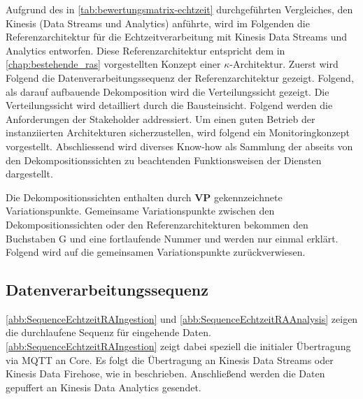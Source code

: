 Aufgrund des in \autoref{tab:bewertungsmatrix-echtzeit} durchgeführten Vergleiches, den Kinesis (Data Streams und Analytics) anführte, wird im Folgenden die Referenzarchitektur für die Echtzeitverarbeitung mit Kinesis Data Streams und Analytics entworfen. Diese Referenzarchitektur entspricht dem in \autoref{chap:bestehende_ras} vorgestellten Konzept einer $\kappa$-Architektur. Zuerst wird Folgend die Datenverarbeitungssequenz der Referenzarchitektur gezeigt. Folgend, als darauf aufbauende Dekomposition wird die Verteilungssicht gezeigt. Die Verteilungssicht wird detailliert durch die Bausteinsicht. Folgend werden die Anforderungen der Stakeholder addressiert. Um einen guten Betrieb der instanziierten Architekturen sicherzustellen, wird folgend ein Monitoringkonzept vorgestellt. Abschliessend wird diverses Know-how als Sammlung der abseits von den Dekompositionssichten zu beachtenden Funktionsweisen der Diensten dargestellt.

Die Dekompositionssichten enthalten durch \textbf{VP} gekennzeichnete Variationspunkte. Gemeinsame Variationspunkte zwischen den Dekompositionssichten oder den Referenzarchitekturen bekommen den Buchstaben G und eine fortlaufende Nummer und werden nur einmal erklärt. Folgend wird auf die gemeinsamen Variationspunkte zurückverwiesen.

\subsection{Datenverarbeitungssequenz}
\autoref{abb:SequenceEchtzeitRAIngestion} und \autoref{abb:SequenceEchtzeitRAAnalysis} zeigen die durchlaufene Sequenz für eingehende Daten. \autoref{abb:SequenceEchtzeitRAIngestion} zeigt dabei speziell die initialer Übertragung via \ac{MQTT} an \AWSIOT{} Core. Es folgt die Übertragung an Kinesis Data Streams oder Kinesis Data Firehose, wie in  beschrieben. Anschließend werden die Daten gepuffert an Kinesis Data Analytics gesendet. 

